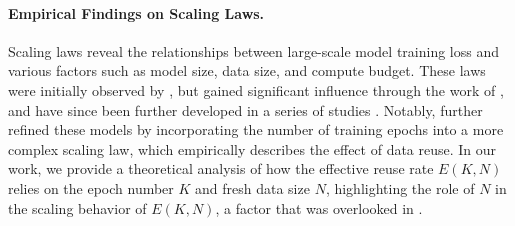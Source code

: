 
\paragraph{Empirical Findings on Scaling Laws.} Scaling laws reveal the relationships between large-scale model training loss and various factors such as model size, data size, and compute budget. These laws were initially observed by \citet{hestness2017deep}, but gained significant influence through the work of \citet{kaplan2020scaling}, and have since been further developed in a series of studies \citep{henighan2020scaling, hoffmann2022training, zhai2022scaling, kadra2023power, aghajanyan2023scaling, muennighoff2023scaling, bi2024deepseek, shuai2024scaling, kumar2024scaling, tissue2024scaling, luo2025multi}. %
Notably, \citet{muennighoff2023scaling} further refined these models by incorporating the number of training epochs into a more complex scaling law, which empirically describes the effect of data reuse. In our work, we provide a theoretical analysis of how the effective reuse rate $E(K,N)$ relies on the epoch number $K$ and fresh data size $N$, highlighting the role of $N$ in the scaling behavior of $E(K,N)$, a factor that was overlooked in \citet{muennighoff2023scaling}. 

